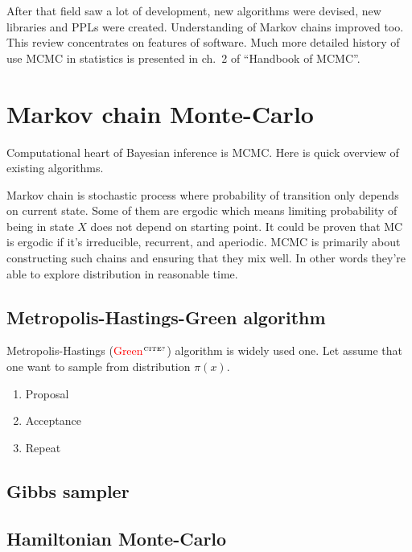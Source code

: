 \documentclass[a4paper]{article}
\newcommand{\FIXME}[1]{\textcolor{red}{#1}}
\newcommand{\citationneeded}{\textcolor{red}{$^{\mbox{\tiny{CITE?}}}$}}
\begin{document}
After that field saw a lot of development, new algorithms were devised, new
libraries and PPLs were created. Understanding of Markov chains improved too.
This review concentrates on features of software.  Much more detailed history of
use MCMC in statistics is presented in ch.~2 of ``Handbook of
MCMC''\cite{brooks2011handbook}.


\section{Markov chain Monte-Carlo}

Computational heart of Bayesian inference is MCMC. Here is quick overview of
existing algorithms.

Markov chain is stochastic process where probability of transition only depends
on current state. Some of them are ergodic which means limiting probability of
being in state $X$ does not depend on starting point. It could be proven that MC
is ergodic if it's irreducible, recurrent, and aperiodic. MCMC is primarily
about constructing such chains and ensuring that they mix well. In other words
they're able to explore distribution in reasonable time.

\subsection{Metropolis-Hastings-Green algorithm}

Metropolis-Hastings\cite{metropolis1953equation}\cite{hastings1970monte}
(\FIXME{Green}\citationneeded) algorithm is widely used one. Let assume that one
want to sample from distribution $\pi(x)$.

\begin{enumerate}
\item Proposal
\item Acceptance
\item Repeat
\end{enumerate}

\subsection{Gibbs sampler}


\subsection{Hamiltonian Monte-Carlo}
\end{document}
